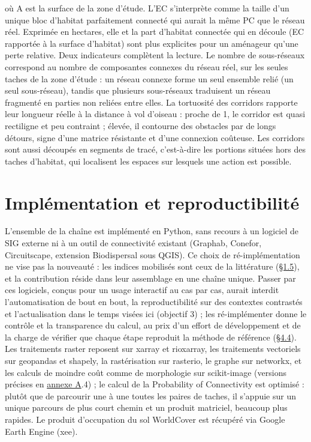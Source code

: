 \documentclass[a4paper,11pt]{report}
\begin{document}
où A est la surface de la zone d'étude. L'EC s'interprète comme la taille d'un unique bloc d'habitat parfaitement connecté qui aurait la même PC que le réseau réel. Exprimée en hectares, elle et la part d'habitat connectée qui en découle (EC rapportée à la surface d'habitat) sont plus explicites pour un aménageur qu'une perte relative. Deux indicateurs complètent la lecture. Le nombre de sous-réseaux correspond au nombre de composantes connexes du réseau réel, sur les seules taches de la zone d'étude : un réseau connexe forme un seul ensemble relié (un seul sous-réseau), tandis que plusieurs sous-réseaux traduisent un réseau fragmenté en parties non reliées entre elles. La tortuosité des corridors rapporte leur longueur réelle à la distance à vol d'oiseau : proche de 1, le corridor est quasi rectiligne et peu contraint ; élevée, il contourne des obstacles par de longs détours, signe d'une matrice résistante et d'une connexion coûteuse. Les corridors sont aussi découpés en segments de tracé, c'est-à-dire les portions situées hors des taches d'habitat, qui localisent les espaces sur lesquels une action est possible.

\section{Implémentation et reproductibilité}\label{sec:2.5}

L'ensemble de la chaîne est implémenté en Python, sans recours à un logiciel de SIG externe ni à un outil de connectivité existant (Graphab, Conefor, Circuitscape, extension Biodispersal sous QGIS). Ce choix de ré-implémentation ne vise pas la nouveauté : les indices mobilisés sont ceux de la littérature (\hyperref[sec:1.5]{§1.5}), et la contribution réside dans leur assemblage en une chaîne unique. Passer par ces logiciels, conçus pour un usage interactif au cas par cas, aurait interdit l'automatisation de bout en bout, la reproductibilité sur des contextes contrastés et l'actualisation dans le temps visées ici (objectif 3) ; les ré-implémenter donne le contrôle et la transparence du calcul, au prix d'un effort de développement et de la charge de vérifier que chaque étape reproduit la méthode de référence (\hyperref[sec:4.4]{§4.4}). Les traitements raster reposent sur xarray et rioxarray, les traitements vectoriels sur geopandas et shapely, la rastérisation sur rasterio, le graphe sur networkx, et les calculs de moindre coût comme de morphologie sur scikit-image (versions précises en \hyperref[annexe:A]{annexe A}.4) ; le calcul de la Probability of Connectivity est optimisé : plutôt que de parcourir une à une toutes les paires de taches, il s'appuie sur un unique parcours de plus court chemin et un produit matriciel, beaucoup plus rapides. Le produit d'occupation du sol WorldCover est récupéré via Google Earth Engine (xee).
\end{document}
